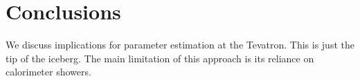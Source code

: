 \section{Conclusions}\label{sec:conclusions}

We discuss implications for parameter estimation at the Tevatron. This
is just the tip of the iceberg. The main limitation of this approach is
its reliance on calorimeter showers.

